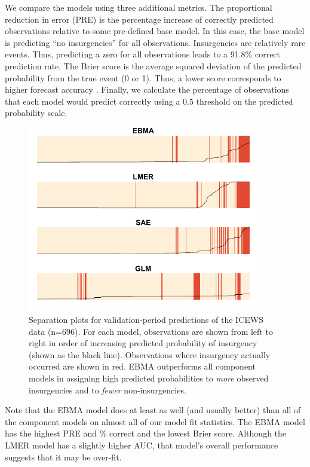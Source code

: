  
We compare the models using three additional metrics.  The
proportional reduction in error (PRE) is the percentage increase of
correctly predicted observations relative to some pre-defined base
model. In this case, the base model is predicting ``no insurgencies''
for all observations.  Insurgencies are relatively rare events.  Thus,
predicting a zero for all observations leads to a 91.8\% correct
prediction rate. The Brier score is the average squared deviation of
the predicted probability from the true event (0 or 1).  Thus, a lower
score corresponds to higher forecast accuracy \citep{Brier:1950}.
Finally, we calculate the percentage of observations that each model
would predict correctly using a 0.5 threshold on the predicted
probability scale.
\begin{figure}
 \caption{\footnotesize Separation plots for validation-period
    predictions of the ICEWS data (n=696).  For each model,
    observations are shown from left to right in order of increasing
    predicted probability of insurgency (shown as the black line).
    Observations where insurgency actually occurred are shown in
    red. EBMA outperforms all component models in assigning high
    predicted probabilities to \textit{more} observed insurgencies and
    to \textit{fewer} non-insurgencies.}
\label{InSam1sep}
\begin{center}
\includegraphics[width=4in]{Insample2.pdf}
\end{center}
\end{figure}

Note that the EBMA model does at least as well (and usually better)
than all of the component models on almost all of our model fit statistics.
The EBMA model has the highest PRE and \% correct and the lowest Brier
score.  Although the LMER model has a slightly higher AUC, that
model's overall performance suggests that it may be over-fit.


